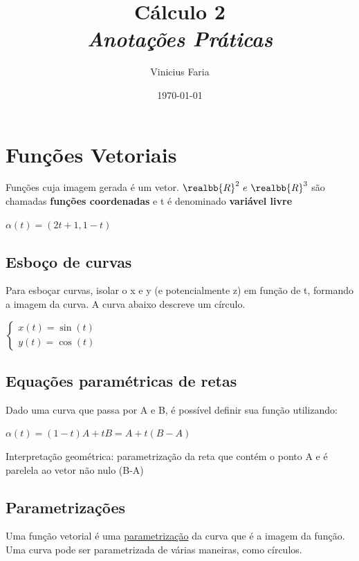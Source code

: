 \documentclass[letterpaper, 11pt]{article}
\author{Vinicius Faria}
\date{\today}
\title{Cálculo 2\\\medskip
\large \emph{Anotações Práticas}}
\begin{document}
\maketitle
\tableofcontents


\section{Funções Vetoriais}
\label{sec:org587decd}
Funções cuja imagem gerada é um vetor. \(\realbb{R}^2 \ e \ \realbb{R}^3\) são chamadas \textbf{funções coordenadas} e t é denominado \textbf{variável livre}

\begin{center}   $\alpha(t) = (2t+1, 1-t)$ \end{center}

\subsection{Esboço de curvas}
\label{sec:org06b9b73}
Para esboçar curvas, isolar o x e y (e potencialmente z) em função de t, formando a imagem da curva. A curva abaixo descreve um círculo.

\begin{center} $\begin{cases} x(t) = \sin (t) \\ y(t) = \cos(t) \end{cases}$ \end{center}

\subsection{Equações paramétricas de retas}
\label{sec:org991895a}
Dado uma curva que passa por A e B, é possível definir sua função utilizando:

\begin{center} $\alpha (t) = (1-t)A + tB = A + t(B-A)$ \end{center}

Interpretação geométrica: parametrização da reta que contém o ponto A e é parelela ao vetor não nulo (B-A)

\subsection{Parametrizações}
\label{sec:org1bbb194}
Uma função vetorial é uma \uline{parametrização} da curva que é a imagem da função. Uma curva pode ser parametrizada de várias maneiras, como círculos.
\end{document}

